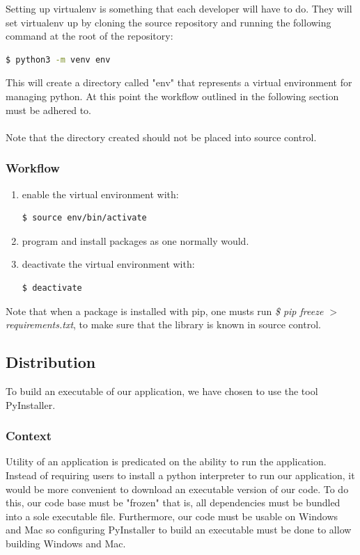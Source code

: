 \documentclass[onecolumn, draftclsnofoot,10pt, compsoc]{IEEEtran}
\begin{document}
Setting up virtualenv is something that each developer will have to do. They will set virtualenv up by cloning the source repository and running the following command at the root of the repository:
\begin{lstlisting}[language=bash]
  $ python3 -m venv env
\end{lstlisting}
\noindent
This will create a directory called "env" that represents a virtual environment for managing python. At this point the workflow outlined in the following section must be adhered to. \\\\
\noindent
Note that the directory created should not be placed into source control.

\subsubsection{Workflow}
\begin{enumerate}
    \item enable the virtual environment with: 
    \begin{lstlisting}[language=bash]
      $ source env/bin/activate
    \end{lstlisting}

    \item program and install packages as one normally would.
    
    \item deactivate the virtual environment with: 
     \begin{lstlisting}[language=bash]
      $ deactivate
    \end{lstlisting}
\end{enumerate}{}
\noindent
Note that when a package is installed with pip, one musts run \textit{\$ pip freeze $>$ requirements.txt}, to make sure that the library is known in source control.

\subsection{Distribution}

To build an executable of our application, we have chosen to use the tool PyInstaller.

\subsubsection{Context}
Utility of an application is predicated on the ability to run the application. Instead of requiring users to install a python interpreter to run our application, it  would be more convenient to download an executable version of our code. To do this, our code base must be "frozen" that is, all dependencies must be bundled into a sole executable file. Furthermore, our code must be usable on Windows and Mac so configuring PyInstaller to build an executable must be done to allow building Windows and Mac. 
\end{document}
